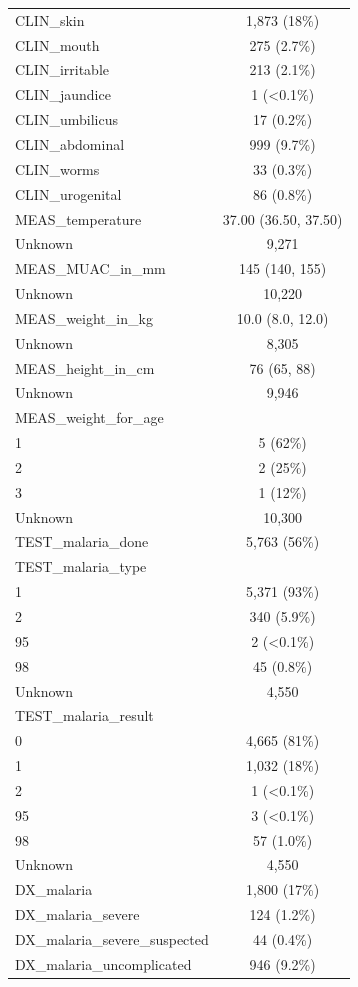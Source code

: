 \documentclass[
  letterpaper,
  DIV=11,
  numbers=noendperiod]{scrreprt}
\begin{document}
\begin{longtable}[]{@{}lc@{}}
CLIN\_skin & 1,873 (18\%) \\
CLIN\_mouth & 275 (2.7\%) \\
CLIN\_irritable & 213 (2.1\%) \\
CLIN\_jaundice & 1 (\textless0.1\%) \\
CLIN\_umbilicus & 17 (0.2\%) \\
CLIN\_abdominal & 999 (9.7\%) \\
CLIN\_worms & 33 (0.3\%) \\
CLIN\_urogenital & 86 (0.8\%) \\
MEAS\_temperature & 37.00 (36.50, 37.50) \\
Unknown & 9,271 \\
MEAS\_MUAC\_in\_mm & 145 (140, 155) \\
Unknown & 10,220 \\
MEAS\_weight\_in\_kg & 10.0 (8.0, 12.0) \\
Unknown & 8,305 \\
MEAS\_height\_in\_cm & 76 (65, 88) \\
Unknown & 9,946 \\
MEAS\_weight\_for\_age & \\
1 & 5 (62\%) \\
2 & 2 (25\%) \\
3 & 1 (12\%) \\
Unknown & 10,300 \\
TEST\_malaria\_done & 5,763 (56\%) \\
TEST\_malaria\_type & \\
1 & 5,371 (93\%) \\
2 & 340 (5.9\%) \\
95 & 2 (\textless0.1\%) \\
98 & 45 (0.8\%) \\
Unknown & 4,550 \\
TEST\_malaria\_result & \\
0 & 4,665 (81\%) \\
1 & 1,032 (18\%) \\
2 & 1 (\textless0.1\%) \\
95 & 3 (\textless0.1\%) \\
98 & 57 (1.0\%) \\
Unknown & 4,550 \\
DX\_malaria & 1,800 (17\%) \\
DX\_malaria\_severe & 124 (1.2\%) \\
DX\_malaria\_severe\_suspected & 44 (0.4\%) \\
DX\_malaria\_uncomplicated & 946 (9.2\%) \\

\end{longtable}
\end{document}
